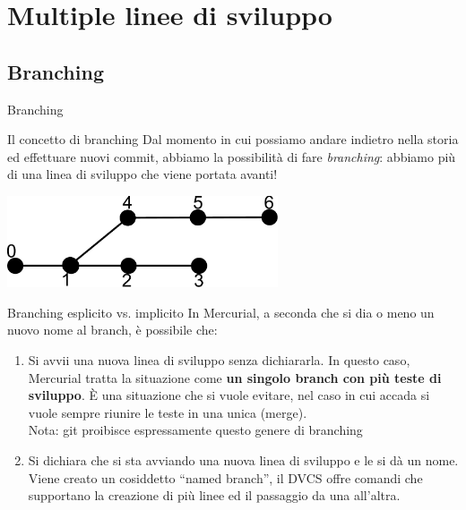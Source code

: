 \documentclass[presentation]{beamer}
\begin{document}
\section{Multiple linee di sviluppo}

\subsection{Branching}

\begin{frame}{Branching}
	\begin{block}{Il concetto di branching}
		Dal momento in cui possiamo andare indietro nella storia ed effettuare nuovi commit, abbiamo la possibilità di fare \textit{branching}: abbiamo più di una linea di sviluppo che viene portata avanti!
		\begin{center}
			\includegraphics[width=0.6\textwidth]{img/branch}
		\end{center}
	\end{block}
\end{frame}

\begin{frame}{Branching esplicito vs. implicito}
	In Mercurial, a seconda che si dia o meno un nuovo nome al branch, è possibile che:
	\begin{enumerate}
		\item Si avvii una nuova linea di sviluppo senza dichiararla. In questo caso, Mercurial tratta la situazione come \textbf{un singolo branch con più teste di sviluppo}. È una situazione che si vuole evitare, nel caso in cui accada si vuole sempre riunire le teste in una unica (merge). \\ \alert{Nota}: git proibisce espressamente questo genere di branching
		\item Si dichiara che si sta avviando una nuova linea di sviluppo e le si dà un nome. Viene creato un cosiddetto ``named branch'', il DVCS offre comandi che supportano la creazione di più linee ed il passaggio da una all'altra.
	\end{enumerate}
\end{frame}
\end{document}
